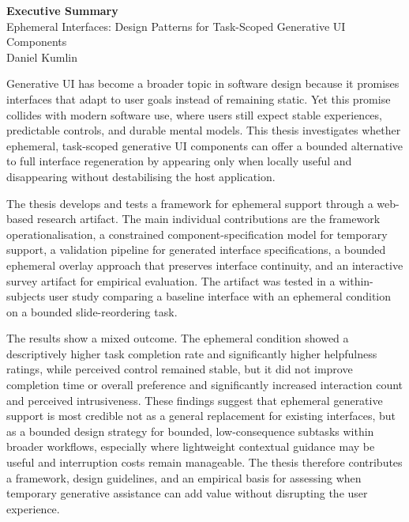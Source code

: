 \documentclass[12pt]{article}
\begin{document}
\thispagestyle{empty}

\begin{center}
    {\LARGE\bfseries Executive Summary}\\[1.2em]
    {\large Ephemeral Interfaces: Design Patterns for Task-Scoped Generative UI Components}\\[0.8em]
    {Daniel Kumlin}
\end{center}

Generative UI has become a broader topic in software design because it promises interfaces that adapt to user goals instead of remaining static. Yet this promise collides with modern software use, where users still expect stable experiences, predictable controls, and durable mental models. This thesis investigates whether ephemeral, task-scoped generative UI components can offer a bounded alternative to full interface regeneration by appearing only when locally useful and disappearing without destabilising the host application.

The thesis develops and tests a framework for ephemeral support through a web-based research artifact. The main individual contributions are the framework operationalisation, a constrained component-specification model for temporary support, a validation pipeline for generated interface specifications, a bounded ephemeral overlay approach that preserves interface continuity, and an interactive survey artifact for empirical evaluation. The artifact was tested in a within-subjects user study comparing a baseline interface with an ephemeral condition on a bounded slide-reordering task.

The results show a mixed outcome. The ephemeral condition showed a descriptively higher task completion rate and significantly higher helpfulness ratings, while perceived control remained stable, but it did not improve completion time or overall preference and significantly increased interaction count and perceived intrusiveness. These findings suggest that ephemeral generative support is most credible not as a general replacement for existing interfaces, but as a bounded design strategy for bounded, low-consequence subtasks within broader workflows, especially where lightweight contextual guidance may be useful and interruption costs remain manageable. The thesis therefore contributes a framework, design guidelines, and an empirical basis for assessing when temporary generative assistance can add value without disrupting the user experience.
\end{document}
